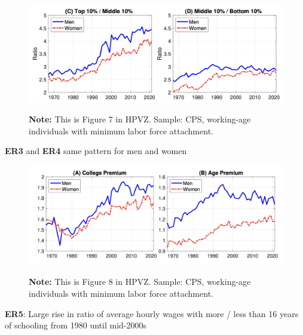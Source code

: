 \documentclass[11pt, aspectratio=169]{beamer}
\begin{document}
\begin{frame}{}
	\begin{figure}
		\includegraphics[scale=0.4]{./figures/inequality_wage_3}
	\vspace*{-2mm}
	\begin{flushleft}
		{\scriptsize \hspace{6mm} \textbf{Note:} This is Figure 7 in HPVZ. Sample: CPS, working-age individuals with minimum labor force attachment.}
	\end{flushleft}	
	\end{figure}

	\vspace{2mm}
	{\color{blue}\textbf{ER3}} and {\color{blue}\textbf{ER4}} same pattern for men and women 
\end{frame}


\begin{frame}{}
	\begin{figure}
		\includegraphics[scale=0.4]{./figures/inequality_wage_4}
	\vspace*{-2mm}
	\begin{flushleft}
		{\scriptsize \hspace{6mm} \textbf{Note:} This is Figure 8 in HPVZ. Sample: CPS, working-age individuals with minimum labor force attachment.}
	\end{flushleft}	
	\end{figure}

	\vspace{2mm}
	{\color{blue}\textbf{ER5}}: Large rise in ratio of average hourly wages with more / less than 16 years of schooling from 1980 until mid-2000s
\end{frame}
\end{document}
